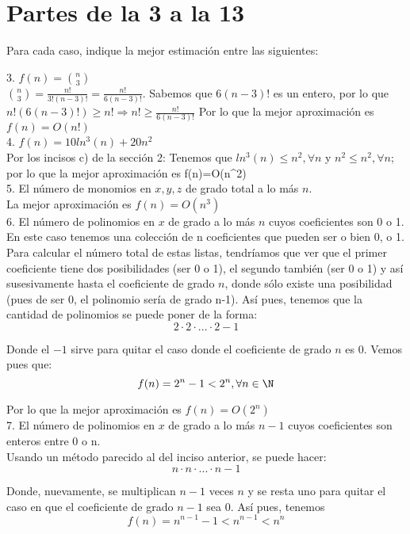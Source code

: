 \documentclass[12pt]{article}
\begin{document}
\section{Partes de la 3 a la 13}
Para cada caso, indique la mejor estimación entre las siguientes:

3. $f(n)=\binom{n}{3}$\\
$\binom{n}{3}=\frac{n!}{3!(n-3)!}=\frac{n!}{6(n-3)!}$. 
Sabemos que $6(n-3)!$ es un entero, por lo que $n!(6(n-3)!)\geq n!\Longrightarrow n! \geq \frac{n!}{6(n-3)!}$
Por lo que la mejor aproximaci\'on es $f(n)=O(n!)$\\

4. $f(n)=10 ln^3(n)+20n^2$\\
Por los incisos c) de la sección 2:
Tenemos que $ln^3(n)\leq n^2, \forall n$ y $n^2\leq n^2, \forall n$; por lo que la mejor aproximaci\'on es f(n)=O(n^2)\\

5. El n\'umero de monomios en $x, y, z$ de grado total a lo m\'as $n$.\\
La mejor aproximaci\'on es $f(n)=O(n^3)$\\


6. El n\'umero de polinomios en $x$ de grado a lo m\'as $n$ cuyos coeficientes son 0 o 1.\\
En este caso tenemos una colección de n coeficientes que pueden ser o bien 0, o 1. Para calcular el número total de estas listas, tendríamos que ver que el primer coeficiente tiene dos posibilidades (ser 0 o 1), el segundo tambi\'en (ser 0 o 1) y as\'{i} susesivamente hasta el coeficiente de grado $n$, donde sólo existe una posibilidad (pues de ser 0, el polinomio sería de grado n-1). Así pues, tenemos que la cantidad de polinomios se puede poner de la forma:
$$2\cdot2\cdot...\cdot2-1$$

Donde el $-1$ sirve para quitar el caso donde el coeficiente de grado $n$ es 0. Vemos pues que:
$$f(n)=2^{n}-1<2^n, \forall n\in\N$$

Por lo que la mejor aproximación es $f(n)=O(2^n)$\\

7. El n\'umero de polinomios en $x$ de grado a lo m\'as $n-1$ cuyos coeficientes son enteros entre 0 o n.\\
Usando un m\'etodo parecido al del inciso anterior, se puede hacer:
$$n\cdot n\cdot...\cdot n-1$$

Donde, nuevamente, se multiplican $n-1$ veces $n$ y se resta uno para quitar el caso en que el coeficiente de grado $n-1$ sea 0. Así pues, tenemos 
$$f(n)=n^{n-1}-1<n^{n-1}<n^n$$
\end{document}
